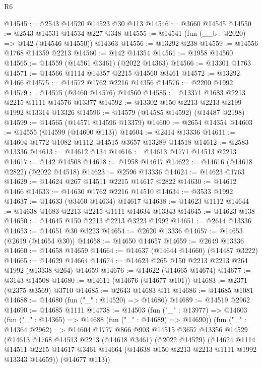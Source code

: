 \begin{lexlean}{R6}
\begin{coremodule}
@14545 := @2543 @14520 @14523 @30 @113
@14546 := @3660 @14545
@14550 := @2543 @14531 @14534 @227 @348
@14555 := @14541 (fun (__b : @2020) => @142 (@14546 @14550)) @14363
@14556 := @13292 @238
@14559 := @14556 @1768 @14359 @2213
@14560 := @142 @14354
@14561 := @1958 @14560
@14565 := @14559 (@14561 @3461) (@2022 @14363)
@14566 := @13301 @1763
@14571 := @14566 @1114 @14357 @2215 @14560 @3461
@14572 := @13292 @1466
@14575 := @14572 @1762 @2216 @14356
@14576 := @2200 @1992
@14579 := @14575 (@3460 @14576) @14560
@14585 := @13371 @1683 @2213 @2215 @1111 @14576 @13377
@14592 := @13302 @150 @2213 @2213 @2199 @1992 @13314 @13326
@14596 := @14579 (@14585 @14592) (@14487 @2198)
@14599 := @14565 (@14571 @14596 @13379)
@14600 := @2654 @14354
@14603 := @14555 (@14599 (@14600 @113))
@14604 := @2414 @13336
@14611 := @14604 @1772 @1082 @1112 @14515 @3657 @13289 @14518
@14612 := @2583 @13336
@14613 := @14612 @134
@14616 := @14613 @1771 @14513 @2213
@14617 := @142 @14508
@14618 := @1958 @14617
@14622 := @14616 (@14618 @2822) (@2022 @14518)
@14623 := @2596 @13336
@14624 := @14623 @1763
@14629 := @14624 @267 @14511 @2215 @14617 @2822
@14630 := @14612 @1466
@14633 := @14630 @1762 @2216 @14510
@14634 := @3533 @1992
@14637 := @14633 (@3460 @14634) @14617
@14638 := @14623 @1112
@14644 := @14638 @1683 @2213 @2215 @1111 @14634 @13343
@14645 := @14623 @138
@14650 := @14645 @150 @2213 @2213 @3223 @1992
@14651 := @2614 @13336
@14653 := @14651 @30 @3223
@14654 := @2620 @13336
@14657 := @14653 (@2619 (@14654 @30))
@14658 := @14650 @14657
@14659 := @2649 @13336
@14660 := @14658 @14659
@14664 := @14637 (@14644 @14660) (@14487 @3222)
@14665 := @14629 @14664
@14674 := @14623 @265 @150 @2213 @2213 @264 @1992 (@13338 @264) @14659
@14676 := @14622 (@14665 @14674)
@14677 := @3143 @14508
@14680 := @14611 (@14676 (@14677 @101))
@14683 := @2371 (@2375 @3569) @3710
@14685 := @2643 @14683 @11
@14686 := @14685 @1081
@14688 := @14680 (fun ("_" : @14520) => @14686)
@14689 := @14519 @2962
@14690 := @14685 @1111
@14738 := @14503
    (fun ("_" : @13977) =>
    @14603
      (fun ("_" : @14365) => @14688 (fun ("_" : @14689) => @14690))
      (fun ("_" : @14364 @2962) =>
      @14604
        @1777
        @866
        @903
        @14515
        @3657
        @13356
        @14529
        (@14613
          @1768
          @14513
          @2213
          (@14618 @3461)
          (@2022 @14529)
          (@14624
            @1114
            @14511
            @2215
            @14617
            @3461
            @14664
            (@14638 @150 @2213 @2213 @1111 @1992 @13343 @14659))
          (@14677 @113))

\end{coremodule}
\end{lexlean}
